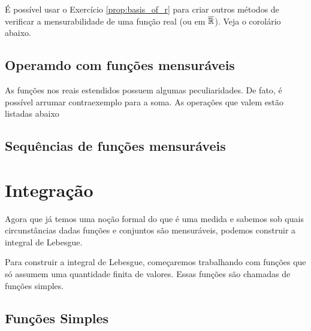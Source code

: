 É possível usar o Exercício \ref{prop:basis_of_r} para criar outros métodos de verificar a mensurabilidade de uma função real (ou em $\overline{\mathbb{R}}$). Veja o corolário abaixo.

\measurableFunctionsInRExtend

\constantFunction
\characteristicFunction

\subsection{Operamdo com funções mensuráveis}
\measurableFunctionsOperations

As funções nos reais estendidos possuem algumas peculiaridades. De fato, é possível arrumar contraexemplo para a soma. As operações que valem estão listadas abaixo

\measurableFunctionsOperationsRExtend

\measurableFunctionsNotation

\subsection{Sequências de funções mensuráveis}

\measurableFunctionsSequences











\section{Integração}

Agora que já temos uma noção formal do que é uma medida e sabemos sob quais circunstâncias dadas funções e conjuntos são mensuráveis, podemos construir a integral de Lebesgue.

Para construir a integral de Lebesgue, começaremos trabalhando com funções que só assumem uma quantidade finita de valores. Essas funções são chamadas de funções simples.

\subsection{Funções Simples}


